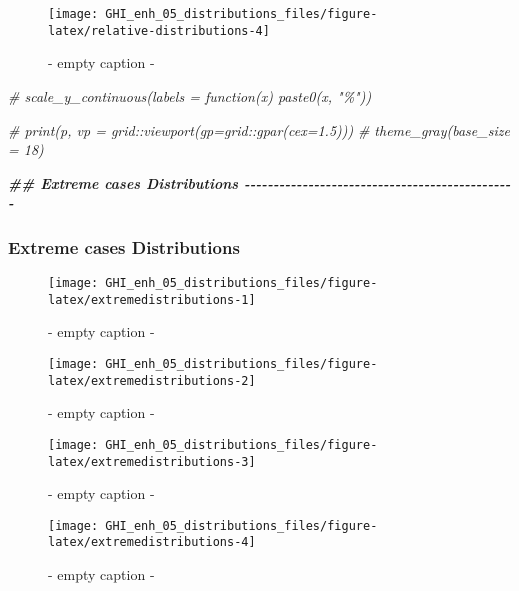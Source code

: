 \documentclass[
  10pt,
  a4paper,oneside]{article}
\newenvironment{Shaded}{\begin{snugshade}}{\end{snugshade}}
\newcommand{\CommentTok}[1]{\textcolor[rgb]{0.56,0.35,0.01}{\textit{#1}}}
\newcommand{\DocumentationTok}[1]{\textcolor[rgb]{0.56,0.35,0.01}{\textbf{\textit{#1}}}}
\begin{document}
\begin{figure}[H]

{\centering \texttt{[image: GHI\_enh\_05\_distributions\_files/figure-latex/relative-distributions-4]} 

}

\caption{ - empty caption - }\label{fig:relative-distributions-4}
\end{figure}

\begin{Shaded}
\begin{Highlighting}[]
  \CommentTok{\# scale\_y\_continuous(labels = function(x) paste0(x, "\%"))}

\CommentTok{\# print(p, vp = grid::viewport(gp=grid::gpar(cex=1.5)))}
\CommentTok{\# theme\_gray(base\_size = 18)}



\DocumentationTok{\#\#  Extreme cases Distributions  {-}{-}{-}{-}{-}{-}{-}{-}{-}{-}{-}{-}{-}{-}{-}{-}{-}{-}{-}{-}{-}{-}{-}{-}{-}{-}{-}{-}{-}{-}{-}{-}{-}{-}{-}{-}{-}{-}{-}{-}{-}{-}{-}{-}{-}{-}{-}}
\end{Highlighting}
\end{Shaded}

\FloatBarrier

\hypertarget{extreme-cases-distributions}{%
\subsubsection{Extreme cases Distributions}\label{extreme-cases-distributions}}

\begin{figure}[H]

{\centering \texttt{[image: GHI\_enh\_05\_distributions\_files/figure-latex/extremedistributions-1]} 

}

\caption{ - empty caption - }\label{fig:extremedistributions-1}
\end{figure}
\begin{figure}[H]

{\centering \texttt{[image: GHI\_enh\_05\_distributions\_files/figure-latex/extremedistributions-2]} 

}

\caption{ - empty caption - }\label{fig:extremedistributions-2}
\end{figure}
\begin{figure}[H]

{\centering \texttt{[image: GHI\_enh\_05\_distributions\_files/figure-latex/extremedistributions-3]} 

}

\caption{ - empty caption - }\label{fig:extremedistributions-3}
\end{figure}
\begin{figure}[H]

{\centering \texttt{[image: GHI\_enh\_05\_distributions\_files/figure-latex/extremedistributions-4]} 

}

\caption{ - empty caption - }\label{fig:extremedistributions-4}
\end{figure}
\end{document}
